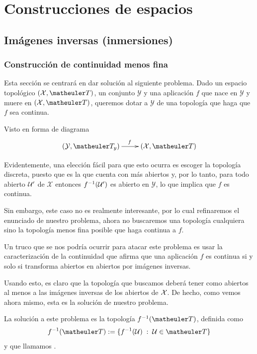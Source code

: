 \chapter{Construcciones de espacios}
\label{const}
\section{Imágenes inversas (inmersiones)}
\subsection{Construcción de continuidad menos fina}
Esta sección se centrará en dar solución al siguiente problema. Dado un espacio topológico $(\mathcal{X},\T)$, un conjunto $\mathcal{Y}$ y una aplicación $f$ que nace en $\mathcal{Y}$ y muere en $(\mathcal{X},\T)$, queremos dotar a $\mathcal{Y}$ de una topología que haga que $f$ sea continua.

Visto en forma de diagrama
\begin{equation*}
\xymatrix{
	(\mc{Y},\T_y) \ar[r]^f
	&(\mathcal{X},\T)}
\end{equation*}

\begin{obs}
	Evidentemente, una elección fácil para que esto ocurra es escoger la topología discreta, puesto que es la que cuenta con más abiertos y, por lo tanto, para todo abierto $\mathcal{U}'$ de $\mathcal{X}$ entonces $f^{-1}(\mathcal{U}')$ es abierto en $\mathcal{Y}$, lo que implica que $f$ es continua.
\end{obs}
Sin embargo, este caso no es realmente interesante, por lo cual refinaremos el enunciado de nuestro problema, ahora no buscaremos una topología cualquiera sino la topología menos fina posible que haga continua a $f$.
\begin{obs}
	Un truco que se nos podría ocurrir para atacar este problema es usar la caracterización de la continuidad que afirma que una aplicación $f$ es continua si y solo si transforma abiertos en abiertos por imágenes inversas.
	
	Usando esto, es claro que la topología que buscamos deberá tener como abiertos al menos a las imágenes inversas de los abiertos de $\mathcal{X}$. De hecho, como vemos ahora mismo, esta es la solución de nuestro problema.
\end{obs}
La solución a este problema es la topología $f^{-1}(\T)$, definida como 
\[f^{-1}(\T):=\{f^{-1}(\U)\midc\U\in \T\}\]
y que llamamos .


